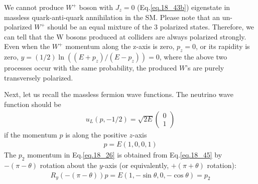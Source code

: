 \documentclass[12pt]{article}
\begin{document}
We cannot produce $W^+$ boson with $J_z=0$ (Eq.\ref{eq.18_43b}) eigenstate in massless quark-anti-quark annihilation in the SM.  Please note that an
un-polarized $W^+$ should be an equal mixture of the $3$ polarized states.
Therefore, we can tell that the W bosons produced at colliders are
always polarized strongly.  Even when the $W^+$ momentum along the z-axis
is zero, $p_z=0$, or its rapidity is zero, $y=(1/2)\ln((E+p_z)/(E-p_z))=0$,
where the above two processes occur with the same probability, the
produced $W$'s are purely transversely polarized.

Next, let us recall the massless fermion wave functions.  The neutrino
wave function should be
\begin{eqnarray}
    u_L(p,-1/2) =  \sqrt{2E}
    \begin{pmatrix}
        0 \\ 1
    \end{pmatrix} \label{eq.18_44}
\end{eqnarray}
if the momentum $p$ is along the positive $z$-axis
\begin{eqnarray}
    p = E(1, 0, 0, 1) \label{eq.18_45}
\end{eqnarray}
The $p_2$ momentum in Eq.\ref{eq.18_26} is obtained from Eq.\ref{eq.18_45} by $-(\pi-\theta)$ rotation about the $y$-axis (or equivalently, $+(\pi+\theta)$ rotation):
\begin{eqnarray}
    R_y(-(\pi-\theta)) p = E(1, -\sin\theta, 0, -\cos\theta) = p_2 \label{eq.18_46}
\end{eqnarray}
\end{document}
